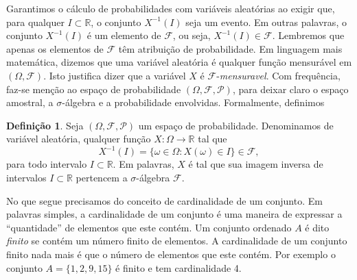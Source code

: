 \documentclass[
]{book}
\theoremstyle{definition}
\newtheorem{definition}{Definição}[chapter]
\theoremstyle{definition}
\theoremstyle{definition}
\theoremstyle{remark}
\begin{document}
Garantimos o cálculo de probabilidades com variáveis aleatórias ao exigir que, para qualquer \(I \subset \mathbb{R}\), o conjunto \(X^{-1}(I)\) seja um evento. Em outras palavras, o conjunto \(X^{-1}(I)\) é um
elemento de \(\mathcal{F}\), ou seja, \(X^{-1}(I) \in \mathcal{F}\). Lembremos que apenas os elementos de
\(\mathcal{F}\) têm atribuição de probabilidade. Em linguagem mais matemática, dizemos que uma variável aleatória é qualquer função mensurável em \((\Omega,\mathcal{F})\). Isto justifica dizer que a
variável \(X\) é \(\mathcal{F}\)-\emph{mensuravel}. Com frequência, faz-se menção ao espaço de probabilidade \((\Omega, \mathcal{F},\mathcal{P})\), para deixar claro o espaço amostral, a \(\sigma\)-álgebra e a probabilidade envolvidas. Formalmente, definimos

\begin{definition}
\protect\hypertarget{def:Def1}{}{\label{def:Def1} }Seja \((\Omega, \mathcal{F}, \mathcal{P})\) um espaço de
probabilidade. Denominamos de variável aleatória, qualquer função
\(X:\Omega \rightarrow \mathbb{R}\) tal que
\begin{equation*}
    X^{-1}(I)=\{\omega \in \Omega : X(\omega) \in I\} \in
    \mathcal{F},
\end{equation*}
para todo intervalo \(I \subset \mathbb{R}\). Em palavras, \(X\) é tal que sua
imagem inversa de intervalos \(I \subset \mathbb{R}\) pertencem a
\(\sigma\)-álgebra \(\mathcal{F}\).
\end{definition}

No que segue precisamos do conceito de cardinalidade de um conjunto. Em palavras simples, a cardinalidade de um conjunto é uma maneira de expressar a ``quantidade'' de elementos que este contém. Um conjunto ordenado \(A\) é dito \emph{finito} se contém um número finito de elementos. A cardinalidade de um conjunto finito nada mais é que o número de elementos que este contém. Por exemplo o conjunto \(A=\{1,2,9,15\}\) é finito e tem cardinalidade 4.
\end{document}
